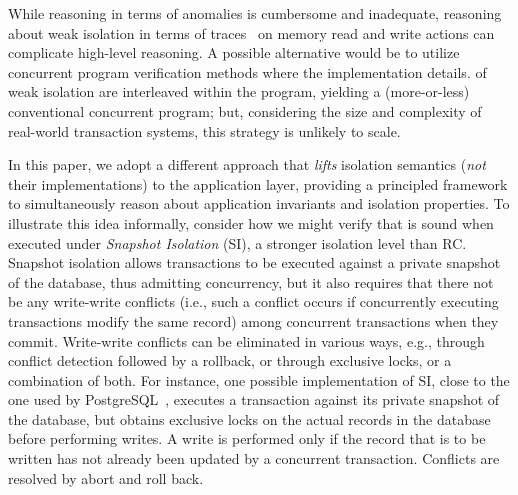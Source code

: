 While reasoning in terms of anomalies is cumbersome and inadequate,
reasoning about weak isolation in terms of
traces~\cite{adyaphd,gotsmanconcur15} on memory read and write actions
can complicate high-level reasoning.  A possible alternative would be
to utilize concurrent program verification methods where the
implementation details. of weak isolation are interleaved within the
program, yielding a (more-or-less) conventional concurrent program;
but, considering the size and complexity of real-world transaction
systems, this strategy is unlikely to scale.

In this paper, we adopt a different approach that \emph{lifts}
isolation semantics (\emph{not} their implementations) to the
application layer, providing a principled framework to simultaneously
reason about application invariants and isolation properties.  To
illustrate this idea informally, consider how we might verify that
 is sound when executed under \emph{Snapshot Isolation}
(SI), a stronger isolation level than RC. Snapshot isolation allows
transactions to be executed against a private snapshot of the
database, thus admitting concurrency, but it also requires that there
not be any write-write conflicts (i.e., such a conflict occurs if
concurrently executing transactions modify the same record) among
concurrent transactions when they commit. Write-write conflicts can be
eliminated in various ways, e.g., through conflict detection followed
by a rollback, or through exclusive locks, or a combination of both.
For instance, one possible implementation of SI, close to the one used
by PostgreSQL~\cite{postgresiso}, executes a transaction against its
private snapshot of the database, but obtains exclusive locks on the
actual records in the database before performing writes. A write is
performed only if the record that is to be written has not already
been updated by a concurrent transaction. Conflicts are resolved by
abort and roll back.



